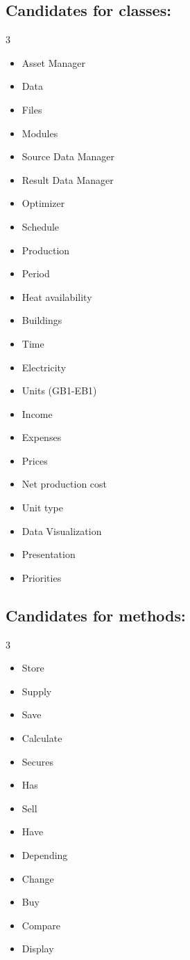 \vspace{2em}

\subsection*{\textcolor{nounred}{Candidates for classes:}}
\begin{multicols}{3} %
\begin{itemize}
    \item Asset Manager
    \item Data
    \item Files
    \item Modules
    \item Source Data Manager
    \item Result Data Manager
    \item Optimizer
    \item Schedule
    \item Production
    \item Period
    \item Heat availability
    \item Buildings
    \item Time
    \item Electricity
    \item Units (GB1-EB1)
    \item Income
    \item Expenses
    \item Prices
    \item Net production cost
    \item Unit type
    \item Data Visualization
    \item Presentation
    \item Priorities
\end{itemize}
\end{multicols}

\vspace{2em}

\subsection*{\textcolor{verbblue}{Candidates for methods:}}
\begin{multicols}{3}
\begin{itemize}
    \item Store
    \item Supply
    \item Save
    \item Calculate
    \item Secures
    \item Has
    \item Sell
    \item Have
    \item Depending
    \item Change
    \item Buy
    \item Compare
    \item Display
\end{itemize}
\end{multicols}

